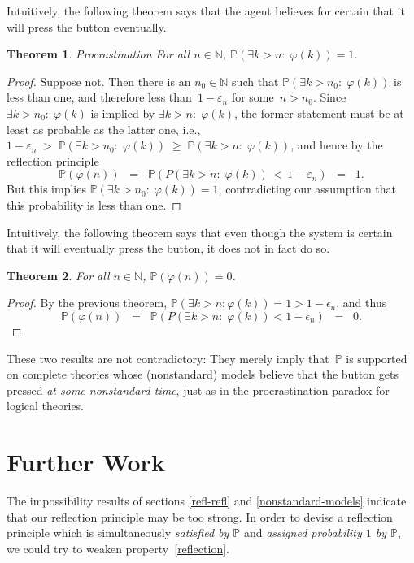 \documentclass[12pt]{article}
\newcommand{\PP}{\mathbb{P}}
\newcommand{\vp}{\varphi}
\newcommand{\NN}{\mathbb{N}}
\theoremstyle{plain}
\newtheorem{theorem}{Theorem}[subsection]
\theoremstyle{definition}
\theoremstyle{remark}
\begin{document}
Intuitively, the following theorem says that the agent believes for certain that it will press the button eventually.
\begin{theorem} \emph{Procrastination}
For all $n\in\NN$, $\PP(\exists k>n{:}\;\vp(k)) = 1$.
\end{theorem}
\begin{proof}
Suppose not. Then there is an $n_0\in\NN$ such that $\PP(\exists k>n_0{:}\;\vp(k))$ is less than one, and therefore less than~$1 - \varepsilon_n$ for some~$n>n_0$. Since $\exists k>n_0{:}\;\vp(k)$ is implied by $\exists k>n{:}\; \vp(k)$, the former statement must be at least as probable as the latter one, i.e., $1 - \varepsilon_n \;>\; \PP(\exists k>n_0{:}\; \vp(k)) \;\ge\; \PP(\exists k>n{:}\;\vp(k))$, and hence by the reflection principle
\[
\PP(\vp(n)) \;\;=\;\; \PP(P(\exists k>n{:}\;\vp(k)) \,<\, 1 - \varepsilon_n) \;\;=\;\; 1.
\]
But this implies $\PP(\exists k>n_0{:}\;\vp(k)) = 1$, contradicting our assumption that this probability is less than one.
\end{proof}
Intuitively, the following theorem says that even though the system is certain that it will eventually press the button, it does not in fact do so.
\begin{theorem}
For all $n\in\NN$, $\PP(\vp(n)) = 0$.
\end{theorem}
\begin{proof}
By the previous theorem, $\PP(\exists k>n:\vp(k)) = 1 > 1 - \epsilon_n$, and thus
\[\PP(\vp(n)) \;\;=\;\; \PP(P(\exists k>n{:}\;\vp(k)) < 1 - \epsilon_n) \;\;=\;\; 0.\]
\end{proof}
These two results are not contradictory: They merely imply that~$\PP$ is supported on complete theories whose (nonstandard) models believe that the button gets pressed \emph{at some nonstandard time}, just as in the procrastination paradox for logical theories.
\fi
\section{Further Work}
\label{further-work}

The impossibility results of sections \ref{refl-refl} and \ref{nonstandard-models} indicate that our reflection principle may be too strong.
In order to devise a reflection principle which is simultaneously \emph{satisfied by $\PP$}
and \emph{assigned probability $1$ by $\PP$},
we could try to weaken property~\ref{reflection}.
\end{document}
